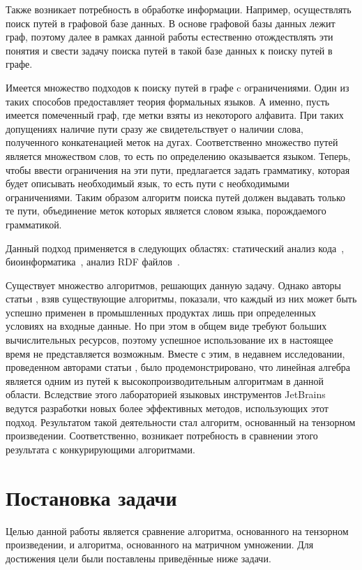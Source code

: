 \documentclass[14pt]{matmex-diploma}
\theoremstyle{definition}
\begin{document}
Также возникает потребность в обработке информации. Например, осуществлять поиск путей в графовой базе данных. В основе графовой базы данных лежит граф, поэтому далее в рамках данной работы естественно отождествлять эти понятия и свести задачу поиска путей в такой базе данных к поиску путей в графе.

Имеется множество подходов к поиску путей в графе c ограничениями. Один из таких способов предоставляет теория формальных языков. А именно, пусть имеется помеченный граф, где метки взяты из некоторого алфавита. При таких допущениях наличие пути сразу же свидетельствует о наличии слова, полученного конкатенацией меток на дугах. Соответственно множество путей является множеством слов, то есть по определению оказывается языком. Теперь, чтобы ввести ограничения на эти пути, предлагается задать грамматику, которая будет описывать необходимый язык, то есть пути с необходимыми ограничениями. Таким образом алгоритм поиска путей должен выдавать только те пути, объединение меток которых является словом языка, порождаемого грамматикой. 

Данный подход применяется в следующих областях: статический анализ кода~\cite{Stat}, биоинформатика~\cite{Bio}, анализ RDF файлов~\cite{RDF}.

Существует множество алгоритмов, решающих данную задачу. Однако авторы статьи \cite{oper_matrix}, взяв существующие алгоритмы, показали, что каждый из них может быть успешно применен в промышленных продуктах лишь при определенных условиях на входные данные. Но при этом в общем виде требуют больших вычислительных ресурсов, поэтому успешное использование их в настоящее время не представляется возможным. Вместе с этим, в недавнем исследовании, проведенном авторами статьи \cite{mishin}, было продемонстрировано, что линейная алгебра является одним из путей к высокопроизводительным алгоритмам в данной области. Вследствие этого лабораторией языковых инструментов JetBrains ведутся разработки новых более эффективных методов, использующих этот подход. Результатом такой деятельности стал алгоритм, основанный на тензорном произведении. Соответственно, возникает потребность в сравнении этого результата с конкурирующими алгоритмами.

\section{Постановка задачи}
Целью данной работы является сравнение алгоритма, основанного на тензорном произведении, и алгоритма, основанного на матричном умножении. Для достижения цели были поставлены приведённые ниже задачи.
\end{document}
